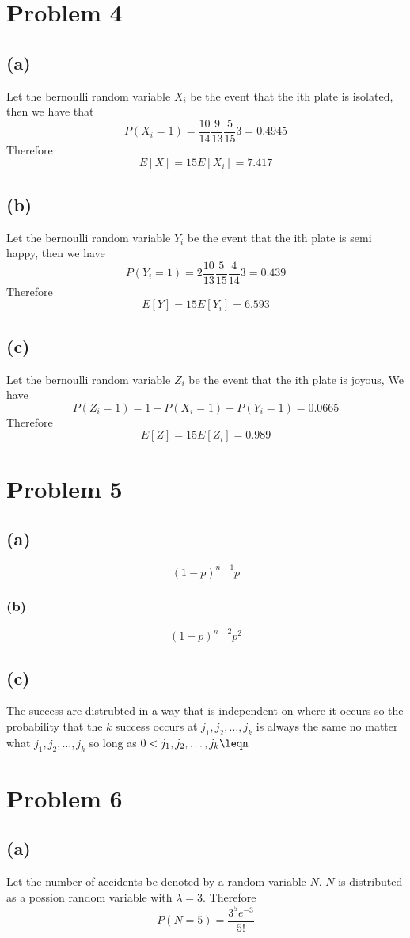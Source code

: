 \section*{Problem 4}
\subsection*{(a)}
Let the bernoulli random variable $X_i$ be the event 
that the ith plate is isolated, then we have that 
$$P(X_i=1)=\frac{10}{14}\frac{9}{13}\frac{5}{15}3=0.4945$$
Therefore 
$$E[X]=15E[X_i]=\boxed{7.417}$$
\subsection*{(b)}
Let the bernoulli random variable $Y_i$ be the event
that the ith plate is semi happy, then we have
$$P(Y_i=1)=2\frac{10}{13}\frac{5}{15}\frac{4}{14}3=0.439$$
Therefore
$$E[Y]=15E[Y_i]=\boxed{6.593}$$
\subsection*{(c)}
Let the bernoulli random variable $Z_i$ be the event
that the ith plate is joyous, We have
$$P(Z_i=1)=1-P(X_i=1)-P(Y_i=1)=0.0665$$
Therefore
$$E[Z]=15E[Z_i]=\boxed{0.989}$$
\section*{Problem 5}
\subsection*{(a)}
$$\boxed{(1-p)^{n-1}p}$$
\subsubsection{(b)}
$$\boxed{(1-p)^{n-2}p^2}$$
\subsection*{(c)}
The success are distrubted in a way that
is independent on where it occurs so 
the probability that the $k$ success occurs at 
$j_1,j_2,\dots,j_k$ is always the same no matter what
$j_1,j_2,\dots,j_k$ so long as $0<j_1,j_2,\dots,j_k\leqn$
\section*{Problem 6}
\subsection*{(a)}
Let the number of accidents be denoted by a random variable
$N$. $N$ is distributed as a possion random variable with
$\lambda=3$. Therefore
$$P(N=5)=\boxed{\frac{3^5e^{-3}}{5!}}$$
